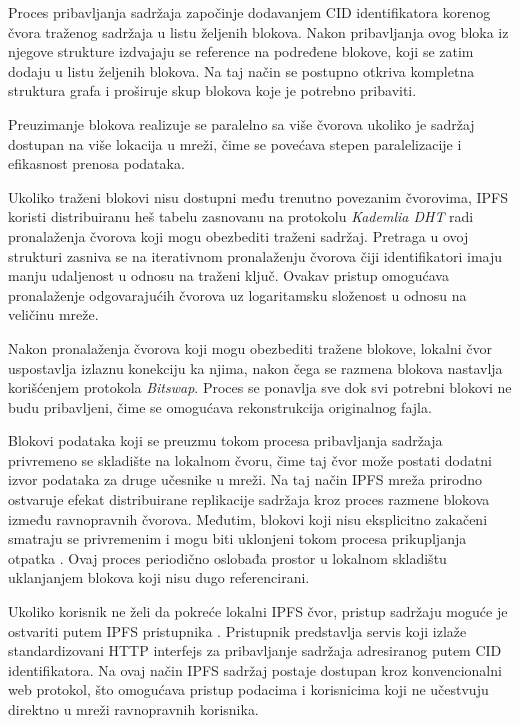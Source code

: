 Proces pribavljanja sadržaja započinje dodavanjem CID identifikatora korenog čvora traženog sadržaja u listu željenih blokova. Nakon pribavljanja ovog bloka iz njegove strukture izdvajaju se reference na podređene blokove, koji se zatim dodaju u listu željenih blokova. Na taj način se postupno otkriva kompletna struktura grafa i proširuje skup blokova koje je potrebno pribaviti.

Preuzimanje blokova realizuje se paralelno sa više čvorova ukoliko je sadržaj dostupan na više lokacija u mreži, čime se povećava stepen paralelizacije i efikasnost prenosa podataka.

Ukoliko traženi blokovi nisu dostupni među trenutno povezanim čvorovima, IPFS koristi distribuiranu heš tabelu zasnovanu na protokolu \textit{Kademlia DHT} \cite{maymounkov2002kademlia} radi pronalaženja čvorova koji mogu obezbediti traženi sadržaj. Pretraga u ovoj strukturi zasniva se na iterativnom pronalaženju čvorova čiji identifikatori imaju manju udaljenost u odnosu na traženi ključ. Ovakav pristup omogućava pronalaženje odgovarajućih čvorova uz logaritamsku složenost u odnosu na veličinu mreže.

Nakon pronalaženja čvorova koji mogu obezbediti tražene blokove, lokalni čvor uspostavlja izlaznu konekciju ka njima, nakon čega se razmena blokova nastavlja korišćenjem protokola \textit{Bitswap}. Proces se ponavlja sve dok svi potrebni blokovi ne budu pribavljeni, čime se omogućava rekonstrukcija originalnog fajla.

Blokovi podataka koji se preuzmu tokom procesa pribavljanja sadržaja privremeno se skladište na lokalnom čvoru, čime taj čvor može postati dodatni izvor podataka za druge učesnike u mreži. Na taj način IPFS mreža prirodno ostvaruje efekat distribuirane replikacije sadržaja kroz proces razmene blokova između ravnopravnih čvorova. Međutim, blokovi koji nisu eksplicitno zakačeni smatraju se privremenim i mogu biti uklonjeni tokom procesa prikupljanja otpatka . Ovaj proces periodično oslobađa prostor u lokalnom skladištu uklanjanjem blokova koji nisu dugo referencirani.

Ukoliko korisnik ne želi da pokreće lokalni IPFS čvor, pristup sadržaju moguće je ostvariti putem IPFS pristupnika . Pristupnik predstavlja servis koji izlaže standardizovani HTTP interfejs za pribavljanje sadržaja adresiranog putem CID identifikatora. Na ovaj način IPFS sadržaj postaje dostupan kroz konvencionalni web protokol, što omogućava pristup podacima i korisnicima koji ne učestvuju direktno u mreži ravnopravnih korisnika.

